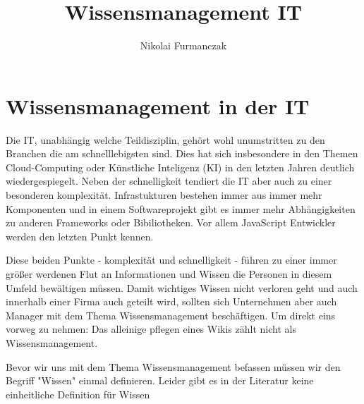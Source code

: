 \documentclass{article}
\title{Wissensmanagement IT}
\author{Nikolai Furmanczak}
\date{}
\begin{document}
\section*{Wissensmanagement in der IT}
Die IT, unabhängig welche Teildisziplin, gehört wohl unumstritten zu den Branchen die am schnelllebigsten sind. Dies hat sich insbesondere in den Themen Cloud-Computing oder Künstliche Inteligenz (KI) in den letzten Jahren deutlich wiedergespiegelt. Neben der schnelligkeit tendiert die IT aber auch zu einer besonderen komplexität. Infrastukturen bestehen immer aus immer mehr Komponenten und in einem Softwareprojekt gibt es immer mehr Abhängigkeiten zu anderen Frameworks oder Bibiliotheken. Vor allem JavaScript Entwickler werden den letzten Punkt kennen. 
\par
Diese beiden Punkte - komplexität und schnelligkeit - führen zu einer immer größer werdenen Flut an Informationen und Wissen die Personen in diesem Umfeld bewältigen müssen. Damit wichtiges Wissen nicht verloren geht und auch innerhalb einer Firma auch geteilt wird, sollten sich Unternehmen aber auch Manager mit dem Thema Wissensmanagement beschäftigen. Um direkt eins vorweg zu nehmen: Das alleinige pflegen eines Wikis zählt nicht als Wissensmanagement.\par
\bigskip 
Bevor wir uns mit dem Thema Wissensmanagement befassen müssen wir den Begriff "Wissen" einmal definieren. Leider gibt es in der Literatur keine einheitliche Definition für Wissen \citep{ReinmannRothmeierMandl2000}


\end{document}
